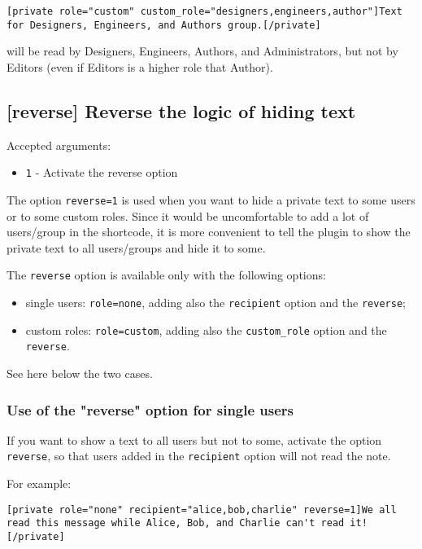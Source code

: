 \documentclass[a4paper,11pt]{article}
\begin{document}
\begin{lstlisting}
[private role="custom" custom_role="designers,engineers,author"]Text for Designers, Engineers, and Authors group.[/private]
\end{lstlisting}

will be read by Designers, Engineers, Authors, and Administrators, but not by Editors (even if Editors is a higher role that Author).

\subsection{[reverse] Reverse the logic of hiding text}

Accepted arguments:

\begin{itemize}
 \item \verb+1+ - Activate the reverse option
\end{itemize}


The option \verb+reverse=1+ is used when you want to hide a private text to some users or to some custom roles. Since it would be uncomfortable to add a lot of users/group in the shortcode, it is more convenient to tell the plugin to show the private text to all users/groups and hide it to some.

The \verb+reverse+ option is available only with the following options:

\begin{itemize}
 \item single users: \verb+role=none+, adding also the \verb+recipient+ option and the \verb+reverse+;
 \item custom roles: \verb+role=custom+, adding also the \verb+custom_role+ option and the \verb+reverse+.
\end{itemize}

See here below the two cases.

\subsubsection{Use of the "reverse" option for single users}

If you want to show a text to all users but not to some, activate the option \verb+reverse+, so that users added in the \verb+recipient+ option will not read the note.

For example:

\begin{lstlisting}
[private role="none" recipient="alice,bob,charlie" reverse=1]We all read this message while Alice, Bob, and Charlie can't read it![/private]
\end{lstlisting}
\end{document}
